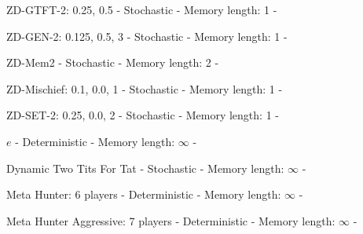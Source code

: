 \item ZD-GTFT-2: 0.25, 0.5 - Stochastic - Memory length: 1 - \cite{Stewart2012}
\item ZD-GEN-2: 0.125, 0.5, 3 - Stochastic - Memory length: 1 - \cite{Kuhn2017}
\item ZD-Mem2 - Stochastic - Memory length: 2 - \cite{LiS2014}
\item ZD-Mischief: 0.1, 0.0, 1 - Stochastic - Memory length: 1 - \cite{Roemheld2013}
\item ZD-SET-2: 0.25, 0.0, 2 - Stochastic - Memory length: 1 - \cite{Kuhn2017}
\item $e$ - Deterministic - Memory length: \(\infty\) - \cite{Knight2018}
\item Dynamic Two Tits For Tat - Stochastic - Memory length: \(\infty\) - \cite{Knight2018}
\item Meta Hunter: 6 players - Deterministic - Memory length: \(\infty\) - \cite{Knight2018}
\item Meta Hunter Aggressive: 7 players - Deterministic - Memory length: \(\infty\) - \cite{Knight2018}
